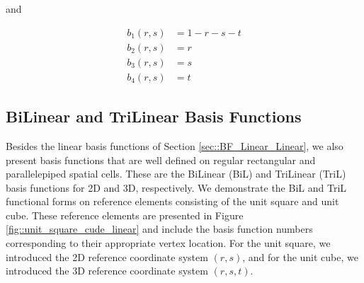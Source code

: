and

\begin{equation}
\label{eq::3D_lin_basis_functions}
\begin{aligned}
	b_1(r,s) & = 1-r-s-t \\
	b_2(r,s) & = r \\
	b_3(r,s) & = s \\
	b_4(r,s) & = t
\end{aligned}
\end{equation}

\subsection{BiLinear and TriLinear Basis Functions}
\label{sec::BF_Linear_BiLTriL}

Besides the linear basis functions of Section \ref{sec::BF_Linear_Linear}, we also present basis functions that are well defined on regular rectangular and parallelepiped spatial cells. These are the BiLinear (BiL) and TriLinear (TriL) basis functions for 2D and 3D, respectively. We demonstrate the BiL and TriL functional forms on reference elements consisting of the unit square and unit cube. These reference elements are presented in Figure \ref{fig::unit_square_cude_linear} and include the basis function numbers corresponding to their appropriate vertex location. For the unit square, we introduced the 2D reference coordinate system $(r,s)$, and for the unit cube, we introduced the 3D reference coordinate system $(r,s,t)$.

